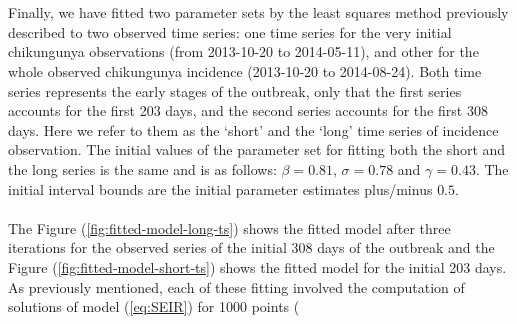 \documentclass[10pt,a4paper]{article}
\begin{document}
%
\\\\
Finally, we have fitted two parameter sets by the least squares method previously described to two observed time series: one time series for the very initial chikungunya observations (from 2013-10-20 to 2014-05-11), and other for the whole observed chikungunya incidence (2013-10-20 to 2014-08-24). 
%
Both time series represents the early stages of the outbreak, only that the first series accounts for the first 203 days, and the second series accounts for the first 308 days. Here we refer to them as the `short' and the `long' time series of incidence observation.
%
The initial values of the parameter set for fitting both the short and the long series is the same and is as follows: $\beta=0.81$, $\sigma=0.78$ and $\gamma=0.43$. The initial interval bounds are the initial parameter estimates plus/minus $0.5$.
%
\\\\
The Figure (\ref{fig:fitted-model-long-ts}) shows the fitted model after three iterations for the observed series of the initial 308 days of the outbreak and the Figure (\ref{fig:fitted-model-short-ts}) shows the fitted model for the initial 203 days. As previously mentioned, each of these fitting involved the computation of solutions of model (\ref{eq:SEIR}) for 1000 points (%
\\\\
\end{document}
